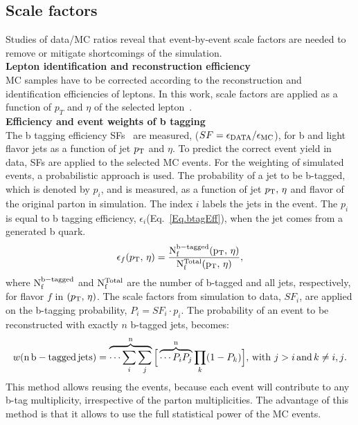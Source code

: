 \subsection{Scale factors}
\label{sec:SF}
Studies of data/MC ratios reveal that event-by-event scale factors are needed to remove or mitigate shortcomings of the simulation.\\
\textbf{Lepton identification and reconstruction efficiency}\\
MC samples have to be corrected according to the reconstruction and identification efficiencies of leptons.
In this work, scale factors are applied as a function of $p_{T}$ and $\eta$ of the selected lepton~\cite{leptonSF}.\\
\textbf{Efficiency and event weights of b tagging}\\
The b tagging efficiency SFs~\cite{leptonSF} are measured, ($SF=\epsilon_{\rm DATA}/\epsilon_{\rm MC}$), for b and light flavor jets as a function of jet $ p_{\rm T} $ and $ \eta $. To predict the correct event yield in data, SFs are applied to the selected MC events. For the weighting of simulated events, a probabilistic approach is used. 
The probability of a jet to be b-tagged, which is denoted by $p_i$, and is measured, as a function of jet $p_{\rm T},\,\eta$ and flavor of the original parton in simulation. The index $i$ labels the jets in the event. The $p_i$ is equal to b tagging efficiency, $\epsilon_i$(Eq.~\ref{Eq.btagEff}), when the jet comes from a generated b quark.
\begin{eqnarray}
\label{Eq.btagEff}
  {\epsilon_f(\ensuremath{p_{\rm T}},\,\eta)=\frac{\rm N_f^{b-tagged}(\ensuremath{p_{\rm T}},\,\eta)}{\rm N_f^{Total}(\ensuremath{p_{\rm T}},\,\eta)}},
\end{eqnarray}
where ${\rm N_f^{b-tagged}}$ and ${\rm N_f^{Total}}$ are the number of b-tagged and all jets, respectively, for flavor $f$ in $(p_{\rm T},\,\eta)$.
The scale factors from simulation to data, $SF_i$, are applied on the b-tagging probability, $P_i=SF_i \cdot p_i$. The probability of an event to be reconstructed with exactly $n$ b-tagged jets, becomes:
\begin{eqnarray}
  {w({\rm n\,b-tagged\,jets})} = {\overbrace{{\cdots\sum_i\sum_j}}^\text{n}\Big[\overbrace{{\cdots P_iP_j}}^\text{n}\prod_{k} (1-P_k)\Big]}, {\rm \,with\,} {\,j>i} {\rm \,and\,} {k\neq i,j}.
\end{eqnarray}
This method allows reusing the events, because each event will contribute to any b-tag multiplicity, irrespective of the parton multiplicities. The advantage of this method is that it allows to use the full statistical power of the MC events.\\
